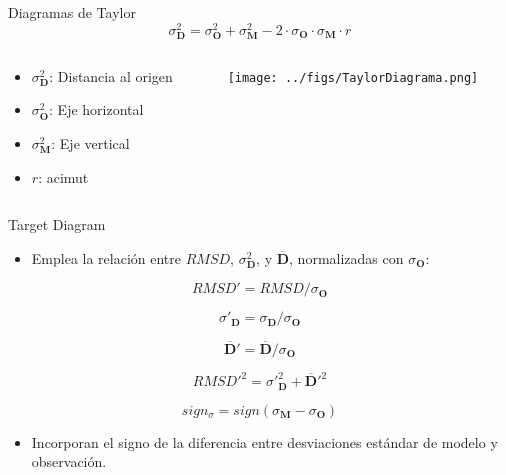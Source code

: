 \documentclass[aspectratio=169, usenames,svgnames,dvipsnames]{beamer}
\begin{document}
\begin{frame}[label={sec:orga4ba439}]{Diagramas de Taylor}
\[
\sigma^2_{\mathbf{D}} = \sigma^2_{\mathbf{O}}  + \sigma^2_{\mathbf{M}}
- 2 \cdot \sigma_{\mathbf{O}} \cdot \sigma_{\mathbf{M}} \cdot r 
\]

\begin{columns}
\begin{column}{0.4\columnwidth}
\begin{itemize}
\item \(\sigma^2_{\mathbf{D}}\): Distancia al origen
\item \(\sigma^2_{\mathbf{O}}\): Eje horizontal
\item \(\sigma^2_{\mathbf{M}}\): Eje vertical
\item \(r\): acimut
\end{itemize}
\end{column}

\begin{column}{0.7\columnwidth}
\begin{center}
\texttt{[image: ../figs/TaylorDiagrama.png]}
\end{center}
\end{column}
\end{columns}
\end{frame}


\begin{frame}[label={sec:org8f0e5de}]{Target Diagram}
\begin{itemize}
\item Emplea la relación entre \(RMSD\), \(\sigma^2_{\mathbf{D}}\), y \(\overline{\mathbf{D}}\), normalizadas con \(\sigma_{\mathbf{O}}\):
\end{itemize}
\[
RMSD' = RMSD / \sigma_{\mathbf{O}}
\]

\[
  \sigma'_{\mathbf{D}} = \sigma_{\mathbf{D}} / \sigma_{\mathbf{O}} 
\]

\[
\overline{\mathbf{D}}' = \overline{\mathbf{D}} / \sigma_{\mathbf{O}}
\]

\[
RMSD'^2= \sigma'^2_{\mathbf{D}} + \overline{\mathbf{D}}'^2
\]

\[
sign_{\sigma} =  sign(\sigma_{\mathbf{M}} - \sigma_{\mathbf{O}} )
\]

\begin{itemize}
\item Incorporan el signo de la diferencia entre desviaciones estándar de modelo y observación.
\end{itemize}

\nocite{Jolliff.Kindle.ea2009}
\end{frame}
\end{document}
